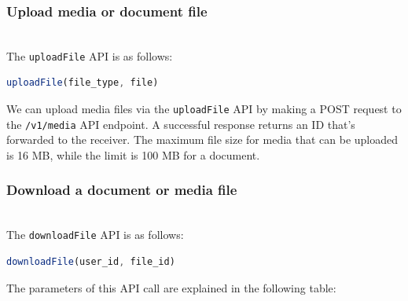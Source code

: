\subsubsection{Upload media or document file}\label{n1nx_EyyZmpdcmfi_Vvg2}
\\
The \texttt{uploadFile} API is as follows:

\begin{lstlisting}[language=JavaScript]
uploadFile(file_type, file)
\end{lstlisting}

We can upload media files via the \texttt{uploadFile} API by making a POST request to the \texttt{/v1/media} API endpoint. A successful response returns an ID that's forwarded to the receiver. The maximum file size for media that can be uploaded is 16 MB, while the limit is 100 MB for a document.

\begin{table}[htbp]
\centering
\small
{}
\end{table}

\subsubsection{Download a document or media file}\label{RJStTlMG3IjUuZXNgSr3r}
\\
The \texttt{downloadFile} API is as follows:

\begin{lstlisting}[language=JavaScript]
downloadFile(user_id, file_id)
\end{lstlisting}

The parameters of this API call are explained in the following table:

\begin{table}[htbp]
\centering
\small
{}
\end{table}


